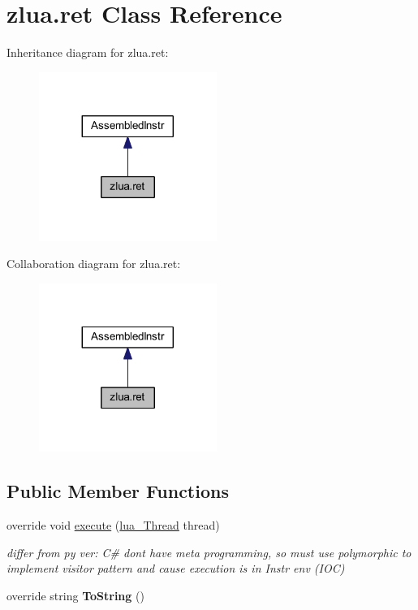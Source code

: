 \hypertarget{classzlua_1_1ret}{}\section{zlua.\+ret Class Reference}
\label{classzlua_1_1ret}


Inheritance diagram for zlua.\+ret\+:
\nopagebreak
\begin{figure}[H]
\begin{center}
\leavevmode
\includegraphics[width=164pt]{classzlua_1_1ret__inherit__graph}
\end{center}
\end{figure}


Collaboration diagram for zlua.\+ret\+:
\nopagebreak
\begin{figure}[H]
\begin{center}
\leavevmode
\includegraphics[width=164pt]{classzlua_1_1ret__coll__graph}
\end{center}
\end{figure}
\subsection*{Public Member Functions}
\begin{DoxyCompactItemize}
\item 
override void \mbox{\hyperlink{classzlua_1_1ret_a0c334b18dbe8e21c26aa785269b29253}{execute}} (\mbox{\hyperlink{classzlua_1_1lua___thread}{lua\+\_\+\+Thread}} thread)
\begin{DoxyCompactList}\small\item\em differ from py ver\+: C\# dont have meta programming, so must use polymorphic to implement visitor pattern and cause execution is in Instr env (I\+OC) \end{DoxyCompactList}\item 
\mbox{\label{classzlua_1_1ret_a7e5681dd57149b9d11f503e980a5acef}} 
override string {\bfseries To\+String} ()
\end{DoxyCompactItemize}
